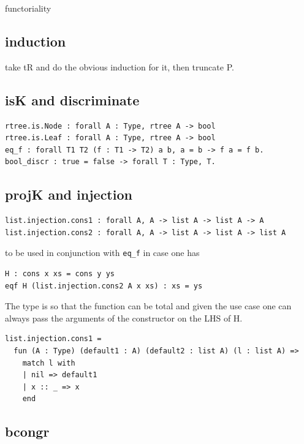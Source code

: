 \documentclass[sigplan,10pt,review]{acmart}\settopmatter{printfolios=true,printccs=false,printacmref=false}
\begin{document}
functoriality

\subsection{induction} %

take tR and do the obvious induction for it, then truncate P.

\subsection{isK and discriminate} %

\begin{lstlisting}
rtree.is.Node : forall A : Type, rtree A -> bool
rtree.is.Leaf : forall A : Type, rtree A -> bool
eq_f : forall T1 T2 (f : T1 -> T2) a b, a = b -> f a = f b.
bool_discr : true = false -> forall T : Type, T.
\end{lstlisting}

\subsection{projK and injection} %

\begin{lstlisting}
list.injection.cons1 : forall A, A -> list A -> list A -> A
list.injection.cons2 : forall A, A -> list A -> list A -> list A
\end{lstlisting}
to be used in conjunction with \lstinline+eq_f+ in case one has

\begin{lstlisting}
H : cons x xs = cons y ys
eqf H (list.injection.cons2 A x xs) : xs = ys
\end{lstlisting}

The type is so that the function can be total and given the use
case one can always pass the arguments of the constructor on the
LHS of H.

\begin{lstlisting}
list.injection.cons1 = 
  fun (A : Type) (default1 : A) (default2 : list A) (l : list A) =>
    match l with
    | nil => default1
    | x :: _ => x
    end
\end{lstlisting}

\subsection{bcongr} %
\end{document}
